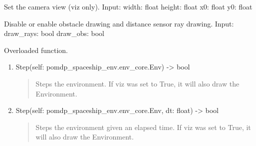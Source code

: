 \documentclass[letterpaper,10pt,english]{sphinxmanual}
\begin{document}
\begin{fulllineitems}
\begin{fulllineitems}
\end{fulllineitems}


\begin{fulllineitems}
\label{\detokenize{pomdp_spaceship_env:pomdp_spaceship_env.Env.SetView}}
Set the camera view (viz only).
Input:
width: float
height: float
x0: float
y0: float

\end{fulllineitems}


\begin{fulllineitems}
\label{\detokenize{pomdp_spaceship_env:pomdp_spaceship_env.Env.SetViz}}
Disable or enable obstacle drawing and distance sensor ray drawing.
Input:
draw\_rays: bool
draw\_obs: bool

\end{fulllineitems}


\begin{fulllineitems}
\label{\detokenize{pomdp_spaceship_env:pomdp_spaceship_env.Env.Step}}
Overloaded function.
\begin{enumerate}
\def\theenumi{\arabic{enumi}}
\def\labelenumi{\theenumi .}
\makeatletter\def\p@enumii{\p@enumi \theenumi .}\makeatother
\item {} 
Step(self: pomdp\_spaceship\_env.env\_core.Env) -\textgreater{} bool
\begin{quote}

Steps the environment. If viz was set to True, it will also draw the Environment.
\end{quote}

\item {} 
Step(self: pomdp\_spaceship\_env.env\_core.Env, dt: float) -\textgreater{} bool
\begin{quote}

Steps the environment given an elapsed time. If viz was set to True, it will also draw the Environment.
\end{quote}

\end{enumerate}

\end{fulllineitems}


\end{fulllineitems}
\end{document}
